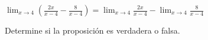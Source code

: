 \item $\displaystyle \lim_{x \to 4} \left( \frac{2x}{x-4} - \frac{8}{x-4} \right) = \lim_{x \to 4} \frac{2x}{x-4} - \lim_{x \to 4} \frac{8}{x-4}$
\par
Determine si la proposición es verdadera o falsa.
